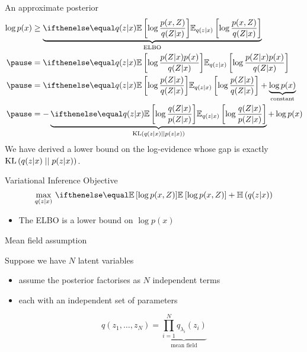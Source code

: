 \begin{frame}{An approximate posterior}
\begin{equation*}
\begin{aligned}
\log p(x) &\geq 
\underbrace{\E[q(z|x)] {\log{\frac{p(x, Z)}{q(Z|x)}}}}_{\text{ELBO}} \\
\pause
&= \E[q(z|x)] {\log{\frac{p(Z|x)p(x)}{q(Z|x)}}} \\
\pause
&= \E[q(z|x)] {\log{\frac{p(Z|x)}{q(Z|x)}}} + \underbrace{\log p(x)}_{\text{constant}}\\
\pause
&= - \underbrace{\E[q(z|x)] {\log{\frac{q(Z|x)}{p(Z|x)}}}}_{\KL{q(z|x)}{p(z|x)}} + \log p(x) 
\end{aligned}
\end{equation*}
\pause
We have derived a lower bound on the log-evidence whose gap is exactly $ \operatorname{KL}\left(q(z|x)\mid\mid p(z|x)\right) $.
\end{frame}


\begin{frame}{Variational Inference}
Objective
\begin{equation*}
\underset{q(z|x)}{\max}~\E{\log p(x,Z)} + \Ent{q(z|x)}
\end{equation*}

\begin{itemize}
\item The ELBO is a lower bound on $ \log p(x) $
\end{itemize}

\end{frame}


\begin{frame}{Mean field assumption}

Suppose we have $N$ latent variables\\
\begin{itemize}
	\item assume the posterior factorises as $N$ independent terms
	\item each with an independent set of parameters
\end{itemize}


\begin{equation*}
q(z_1, \ldots, z_N) = \underbrace{\prod_{i=1}^N q_{\lambda_i}(z_i)}_{\text{mean field}}
\end{equation*}


\end{frame}

